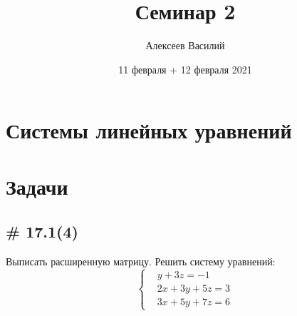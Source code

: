 \documentclass[a4paper,12pt]{article}
\author{Алексеев Василий}
\title{Семинар 2}
\date{11 февраля + 12 февраля 2021}
\begin{document}
  \maketitle
  
  \tableofcontents

  \thispagestyle{empty}
  
  \newpage
  


  \section{Системы линейных уравнений}
  
  \section{Задачи}
  
  
  \subsection{\# 17.1(4)}
  
  Выписать расширенную матрицу.
  Решить систему уравнений:
  \[
    \left\{
    \begin{aligned}
      &y + 3z = -1\\
      &2x + 3y + 5z = 3\\
      &3x + 5y + 7z = 6
    \end{aligned}
    \right.
  \]
  
\end{document}
